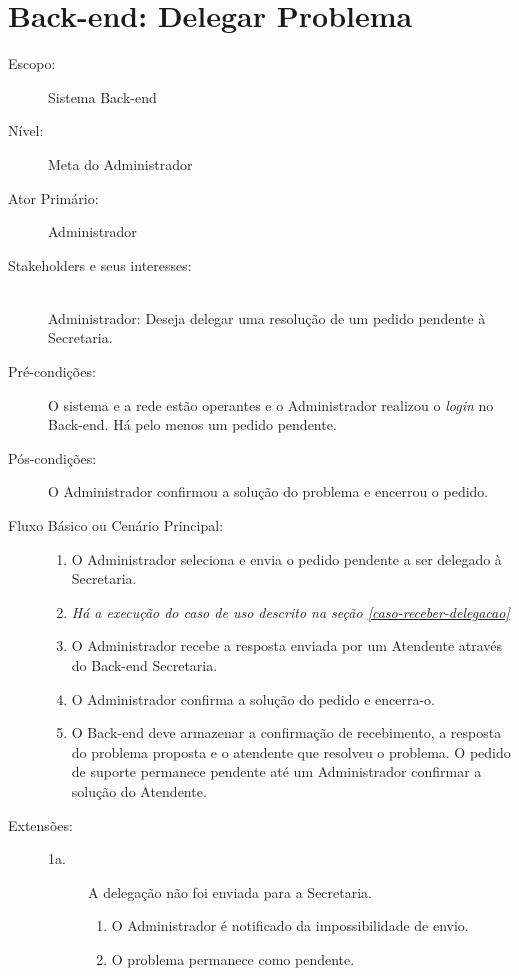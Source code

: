 \documentclass[brazil,times]{abnt}
\begin{document}
\section{Back-end: Delegar Problema}
\begin{description}
\item[Escopo:] Sistema Back-end
\item[Nível:] Meta do Administrador
\item[Ator Primário:] Administrador
\item[Stakeholders e seus interesses:] \hfill \\
Administrador: Deseja delegar uma resolução de um pedido pendente à Secretaria.

\item[Pré-condições:] O sistema e a rede estão operantes e o Administrador
realizou o \emph{login} no Back-end. Há pelo menos um pedido
pendente.

\item[Pós-condições:] O Administrador confirmou a solução do problema e encerrou
o pedido.
\item[Fluxo Básico ou Cenário Principal:]\hfill
\begin{enumerate}
  \item O Administrador seleciona e envia o pedido pendente a ser delegado à
  Secretaria.
  \item \emph{Há a execução do caso de uso descrito na seção
  \ref{caso-receber-delegacao}}
  \item O Administrador recebe a resposta enviada por um Atendente através do
  Back-end Secretaria.
  \item O Administrador confirma a solução do pedido e encerra-o.
  \item O Back-end deve armazenar a confirmação de recebimento, a resposta
  do problema proposta e o atendente que resolveu o problema. O pedido de
  suporte permanece pendente até um Administrador confirmar a solução do Atendente.
\end{enumerate}

\item[Extensões:]\hfill
\begin{description}
	\item[1a.] A delegação não foi enviada para a Secretaria.
	\begin{enumerate}
		\item O Administrador é notificado da impossibilidade de envio.
		\item O problema permanece como pendente.
	\end{enumerate}


\end{description}
\end{description}
\end{document}

